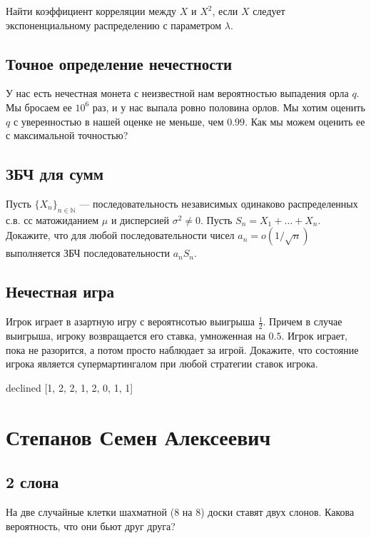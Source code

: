 \documentclass[12pt]{article}
\newcommand\N{\mathbb{N}}
\begin{document}
Найти коэффициент корреляции между $X$ и $X^2$, если $X$ следует экспоненциальному распределению с параметром $\lambda$.



\subsection{Точное определение нечестности}

У нас есть нечестная монета с неизвестной нам вероятностью выпадения орла $q$. Мы бросаем ее $10^6$ раз, и у нас выпала ровно половина орлов. Мы хотим оценить $q$ с уверенностью в нашей оценке не меньше, чем $0.99$. Как мы можем оценить ее с максимальной точностью? 



\subsection{ЗБЧ для сумм}
Пусть $\{X_n\}_{n \in \N}$ --- последовательность независимых одинаково распределенных с.в. сс матожиданием $\mu$ и дисперсией $\sigma^2 \ne 0$. Пусть $S_n = X_1 + \dots + X_n$. Докажите, что для любой последовательности чисел $a_n = o(1/\sqrt{n})$ выполняется ЗБЧ последовательности $a_n S_n$.



\subsection{Нечестная игра}

Игрок играет в азартную игру с вероятнсотью выигрыша $\frac{1}{2}$. Причем в случае выигрыша, игроку возвращается его ставка, умноженная на $0.5$. Игрок играет, пока не разорится, а потом просто наблюдает за игрой. Докажите, что состояние игрока является супермартингалом при любой стратегии ставок игрока.



\newpage
declined  [1, 2, 2, 1, 2, 0, 1, 1]
\section{Степанов Семен Алексеевич}

\subsection{2 слона}

На две случайные клетки шахматной (8 на 8) доски ставят двух слонов. Какова вероятность, что они бьют друг друга?
\end{document}
